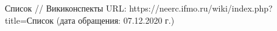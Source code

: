 
\begin{thebibliography}{9} 
    Список
    // Викиконспекты
    URL: https://neerc.ifmo.ru/wiki/index.php?title=Список
    (дата обращения: 07.12.2020 г.)
\end{thebibliography}